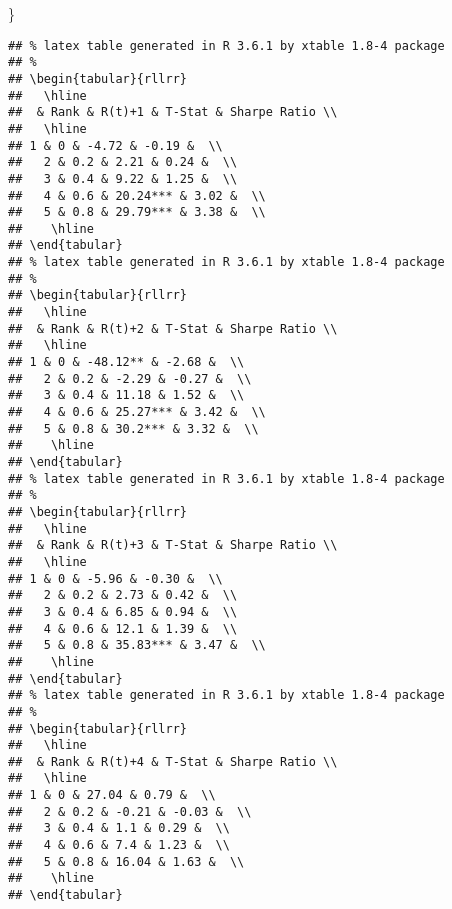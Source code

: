 \documentclass[
]{article}
\newenvironment{Shaded}{\begin{snugshade}}{\end{snugshade}}
\newcommand{\NormalTok}[1]{#1}
\begin{document}
\begin{Shaded}
\begin{Highlighting}[]
\NormalTok{\}}
\end{Highlighting}
\end{Shaded}

\begin{verbatim}
## % latex table generated in R 3.6.1 by xtable 1.8-4 package
## % 
## \begin{tabular}{rllrr}
##   \hline
##  & Rank & R(t)+1 & T-Stat & Sharpe Ratio \\ 
##   \hline
## 1 & 0 & -4.72 & -0.19 &  \\ 
##   2 & 0.2 & 2.21 & 0.24 &  \\ 
##   3 & 0.4 & 9.22 & 1.25 &  \\ 
##   4 & 0.6 & 20.24*** & 3.02 &  \\ 
##   5 & 0.8 & 29.79*** & 3.38 &  \\ 
##    \hline
## \end{tabular}
## % latex table generated in R 3.6.1 by xtable 1.8-4 package
## % 
## \begin{tabular}{rllrr}
##   \hline
##  & Rank & R(t)+2 & T-Stat & Sharpe Ratio \\ 
##   \hline
## 1 & 0 & -48.12** & -2.68 &  \\ 
##   2 & 0.2 & -2.29 & -0.27 &  \\ 
##   3 & 0.4 & 11.18 & 1.52 &  \\ 
##   4 & 0.6 & 25.27*** & 3.42 &  \\ 
##   5 & 0.8 & 30.2*** & 3.32 &  \\ 
##    \hline
## \end{tabular}
## % latex table generated in R 3.6.1 by xtable 1.8-4 package
## % 
## \begin{tabular}{rllrr}
##   \hline
##  & Rank & R(t)+3 & T-Stat & Sharpe Ratio \\ 
##   \hline
## 1 & 0 & -5.96 & -0.30 &  \\ 
##   2 & 0.2 & 2.73 & 0.42 &  \\ 
##   3 & 0.4 & 6.85 & 0.94 &  \\ 
##   4 & 0.6 & 12.1 & 1.39 &  \\ 
##   5 & 0.8 & 35.83*** & 3.47 &  \\ 
##    \hline
## \end{tabular}
## % latex table generated in R 3.6.1 by xtable 1.8-4 package
## % 
## \begin{tabular}{rllrr}
##   \hline
##  & Rank & R(t)+4 & T-Stat & Sharpe Ratio \\ 
##   \hline
## 1 & 0 & 27.04 & 0.79 &  \\ 
##   2 & 0.2 & -0.21 & -0.03 &  \\ 
##   3 & 0.4 & 1.1 & 0.29 &  \\ 
##   4 & 0.6 & 7.4 & 1.23 &  \\ 
##   5 & 0.8 & 16.04 & 1.63 &  \\ 
##    \hline
## \end{tabular}
\end{verbatim}
\end{document}
